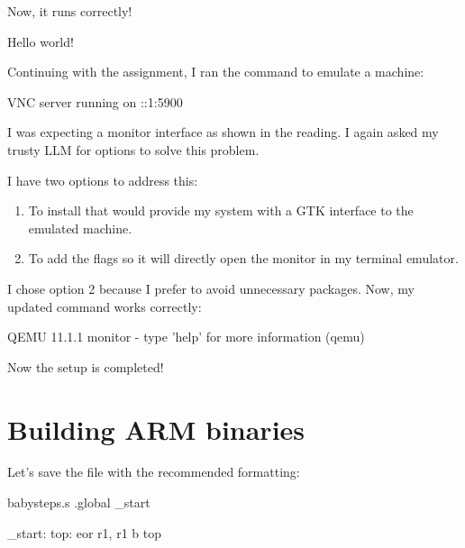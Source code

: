 Now, it runs correctly!

\begin{terminal}
Hello world!
\end{terminal}

Continuing with the assignment, I ran the command to emulate a machine:

\TermPath{~}
\begin{terminal}
VNC server running on ::1:5900
\end{terminal}

I was expecting a monitor interface as shown in the reading.
I again asked my trusty LLM for options to solve this problem.

I have two options to address this:

\begin{enumerate}
    \item To install  that would provide my system with a GTK interface to the emulated machine.
    \item To add the flags  so it will directly open the monitor in my terminal emulator.
\end{enumerate}

I chose option 2 because I prefer to avoid unnecessary packages.
Now, my updated command works correctly:

\TermPath{~}
\begin{terminal}

QEMU 11.1.1 monitor - type 'help' for more information
(qemu)
\end{terminal}

Now the setup is completed!

\section{Building ARM binaries}

Let's save the file  with the recommended formatting:

\begin{codebox}[asm]{babysteps.s}
.global _start

_start:
top:
    eor r1, r1
    b top
\end{codebox}

